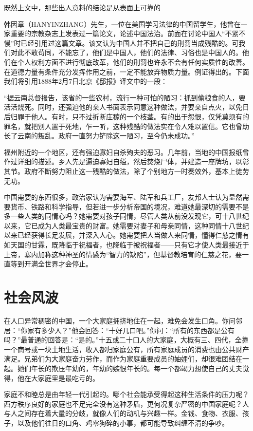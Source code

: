 \documentclass[12pt,oneside]{book}
\begin{document}
\begin{common-format}
既然上文中，那些出人意料的结论是从表面上可靠的 

韩因章（HANYINZHANG）先生，一位在美国学习法律的中国留学生，他曾在一家重要的宗教杂志上发表过一篇论文，论述中国法治。前面在讨论中国人“不紧不慢”时已经引用过这篇文章。该文认为中国人并不把自己的刑罚当成残酷的。可我们对此不敢苟同，不能忘了，他们是中国人，他们的法律、习俗也是中国人的。他们在个人权利方面不进行彻底改革，他们的刑罚也许永不会有任何实质性的改善。在道德力量有条件充分发挥作用之前，一定不能放弃物质力量。例证得出的。下面我们将引用1888年2月7日北京《邸报》译文中的一段： 

“据云南总督报告，该省的一些农村，流行一种可怕的陋习：抓到偷粮食的人，要活活烧死。同时，还强迫他的亲人书面表示同意这种做法，并要亲自点火，以免日后归罪于他人。有时，只不过折断庄稼的一个枝茎。有的出于怨恨，仅凭莫须有的罪名，就把别人置于死地，乍一听，这种残酷的做法实在令人难以置信。它也曾助长了云南的叛乱。政府一直努力铲除这一陋习，至今仍未成功。” 

福州附近的一个地区，还有强迫寡妇自杀殉夫的恶习。几年前，当地的中国报纸曾作过详细的描述。乡人先是逼迫寡妇自缢，然后焚烧尸体，并建造一座牌坊，以彰其节。政府不断努力阻止这一残酷的做法，除了个别地方一时奏效外，基本上徒劳无功。 

中国需要的东西很多，政治家认为需要海军、陆军和兵工厂，友邦人士认为显然需要货币、铁路和科学指导，但若进一步分析帝国的境况，难道她最深切的需要不是多一些人类的同情心吗？她需要对孩子同情，尽管人类从前没发现它，可十八世纪以来，它已成为人类最宝贵的财富。她需要对妻子和母亲同情，这种同情十八世纪以来已经获得长足发展，并深入人心。她需要把人当做人来同情，懂得仁慈之情有如天国的甘霖，既降临于祝福者，也降临于被祝福者——只有它才使人类最接近于上帝，塞内加称这种神圣的情感为“智力的缺陷”，但基督教培育的仁慈之花，要一直等到开满全世界才会停止。 

\chapter{社会风波}
在人口异常稠密的中国，一个大家庭拥挤地住在一起，难免会发生口角。你问邻居：“你家有多少人？”他会回答：“十好几口吧。”你问：“所有的东西都是公有吗？”最普通的回答是：“是的。”十五或二十口人的大家庭，大概有三、四代，全靠一个商号或一块土地生活，收入都归家庭公有，所有家庭成员的消费也由公共财产满足。兄弟们为大家庭奋力劳作，而作为家庭重要成员的妯娌们，却很难团结在一起。她们年长的欺压年幼的，年幼的嫉恨年长的。每一个都竭力想使自己的丈夫觉得，他在大家庭里是最吃亏的。 

家庭不和睦总是由年轻一代引起的。哪个社会能承受得起这种生活条件的压力呢？西方秩序良好的家庭也不足完全没有这种矛盾，更何况复杂严密的中国家庭呢？人与人之间存在着大量的分歧，就像人们的动机与兴趣一样。金钱、食物、衣服、孩子，以及他们往日的口角、鸡零狗碎的小事，都可能导致纠缠不清的争吵。 


\end{common-format}
\end{document}
